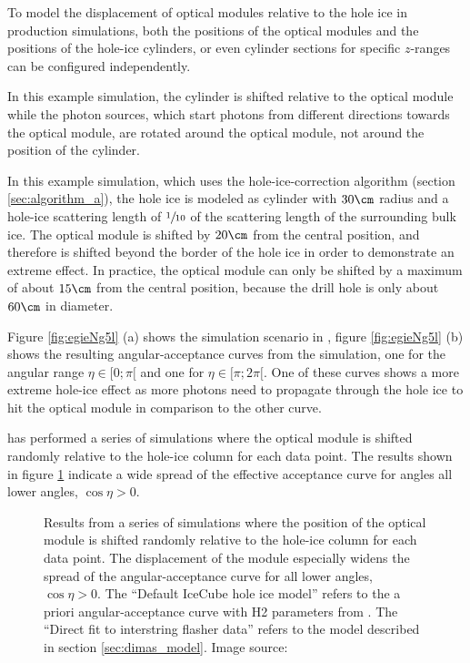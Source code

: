 To model the displacement of optical modules relative to the hole ice in production simulations, both the positions of the optical modules and the positions of the hole-ice cylinders, or even cylinder sections for specific $z$-ranges can be configured independently.

In this example simulation, the cylinder is shifted relative to the optical module while the photon sources, which start photons from different directions towards the optical module, are rotated around the optical module, not around the position of the cylinder.


In this example simulation, which uses the hole-ice-correction algorithm (section \ref{sec:algorithm_a}), the hole ice is modeled as cylinder with $30\cm$ radius and a hole-ice scattering length of $\sfrac{1}{10}$ of the scattering length of the surrounding bulk ice. The optical module is shifted by $20\cm$ from the central position, and therefore is shifted beyond the border of the hole ice in order to demonstrate an extreme effect. In practice, the optical module can only be shifted by a maximum of about $15\cm$ from the central position, because the drill hole is only about $60\cm$ in diameter.

Figure \ref{fig:egieNg5l} (a) shows the simulation scenario in \steamshovel, figure \ref{fig:egieNg5l} (b) shows the resulting angular-acceptance curves from the simulation, one for the angular range $\eta \in [0;\pi[$ and one for $\eta \in [\pi; 2\pi[$. One of these curves shows a more extreme hole-ice effect as more photons need to propagate through the hole ice to hit the optical module in comparison to the other curve.

\rongen \cite{icrc17pocam} has performed a series of simulations where the optical module is shifted randomly relative to the hole-ice column for each data point. The results shown in figure \ref{fig:zao5Mah0} indicate a wide spread of the effective acceptance curve for angles all lower angles, $\cos \eta > 0$.

\begin{figure}[htbp]
  \caption{Results from a series of simulations where the position of the optical module is shifted randomly relative to the hole-ice column for each data point. The displacement of the module especially widens the spread of the angular-acceptance curve for all lower angles, $\cos \eta > 0$. The \enquote{Default IceCube hole ice model} refers to the a priori angular-acceptance curve with H2 parameters from \cite{icepaper}. The \enquote{Direct fit to interstring flasher data} refers to the model described in section \ref{sec:dimas_model}. Image source: \cite{icrc17pocam}}
  \label{fig:zao5Mah0}
\end{figure}
